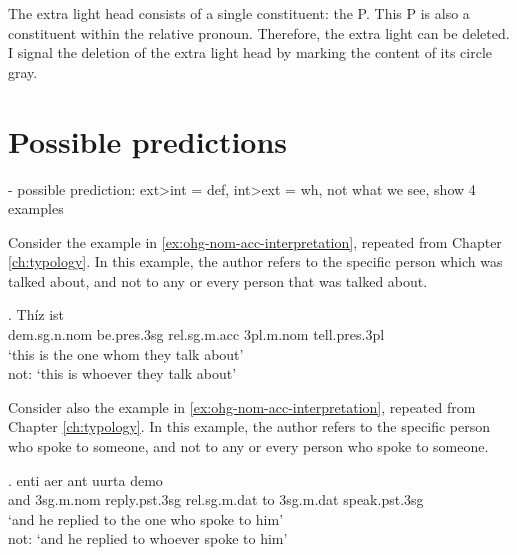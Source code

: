 The extra light head consists of a single constituent: the P.
This P is also a constituent within the relative pronoun. Therefore, the extra light can be deleted. I signal the deletion of the extra light head by marking the content of its circle gray.





\section{Possible predictions}

  - possible prediction: ext>int = def, int>ext = wh, not what we see, show 4 examples



Consider the example in \ref{ex:ohg-nom-acc-interpretation}, repeated from Chapter \ref{ch:typology}.
In this example, the author refers to the specific person which was talked about, and not to any or every person that was talked about.

\exg. Thíz ist   \\
\ac{dem}.\ac{sg}.\ac{n}.\ac{nom} be.\ac{pres}.3\ac{sg}\scsub{[nom]} \ac{rel}.\ac{sg}.\ac{m}.\ac{acc}
3\ac{pl}.\ac{m}.\ac{nom} tell.\ac{pres}.3\ac{pl}\scsub{[acc]}\\
`this is the one whom they talk about'\\
not: `this is whoever they talk about' \label{ex:ohg-nom-acc-interpretation}

Consider also the example in \ref{ex:ohg-nom-acc-interpretation}, repeated from Chapter \ref{ch:typology}.
In this example, the author refers to the specific person who spoke to someone, and not to any or every person who spoke to someone.

\exg. enti aer {ant uurta} demo  \\
and 3\ac{sg}.\ac{m}.\ac{nom} reply.\ac{pst}.3\ac{sg}\scsub{[dat]} \ac{rel}.\ac{sg}.\ac{m}.\ac{dat} {to 3\ac{sg}.\ac{m}.\ac{dat}} speak.\ac{pst}.3\ac{sg}\scsub{[nom]}\\
`and he replied to the one who spoke to him'\\
not: `and he replied to whoever spoke to him'
 \label{ex:ohg-dat-nom-rep}

\phantom{x}
